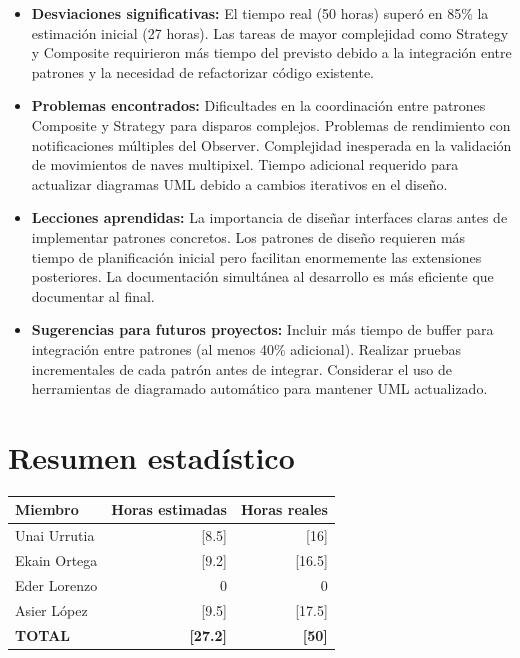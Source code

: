 \documentclass[12pt, a4paper]{article}
\begin{document}
\begin{itemize}[leftmargin=2em]
    \item \textbf{Desviaciones significativas:} El tiempo real (50 horas) superó en 85\% la estimación inicial (27 horas). Las tareas de mayor complejidad como Strategy y Composite requirieron más tiempo del previsto debido a la integración entre patrones y la necesidad de refactorizar código existente.
    \item \textbf{Problemas encontrados:} Dificultades en la coordinación entre patrones Composite y Strategy para disparos complejos. Problemas de rendimiento con notificaciones múltiples del Observer. Complejidad inesperada en la validación de movimientos de naves multipixel. Tiempo adicional requerido para actualizar diagramas UML debido a cambios iterativos en el diseño.
    \item \textbf{Lecciones aprendidas:} La importancia de diseñar interfaces claras antes de implementar patrones concretos. Los patrones de diseño requieren más tiempo de planificación inicial pero facilitan enormemente las extensiones posteriores. La documentación simultánea al desarrollo es más eficiente que documentar al final.
    \item \textbf{Sugerencias para futuros proyectos:} Incluir más tiempo de buffer para integración entre patrones (al menos 40\% adicional). Realizar pruebas incrementales de cada patrón antes de integrar. Considerar el uso de herramientas de diagramado automático para mantener UML actualizado.
\end{itemize}

\vspace{1.5em}

\section{Resumen estadístico}

\begin{center}
    \begin{tabular}{|l|r|r|}
        \hline
        \textbf{Miembro} & \textbf{Horas estimadas} & \textbf{Horas reales} \\
        \hline
        Unai Urrutia & [8.5] & [16] \\
        \hline
        Ekain Ortega & [9.2] & [16.5] \\
        \hline
        Eder Lorenzo & 0 & 0 \\
        \hline
        Asier López & [9.5] & [17.5] \\
        \hline
        \textbf{TOTAL} & \textbf{[27.2]} & \textbf{[50]} \\
        \hline
    \end{tabular}
\end{center}
\end{document}
